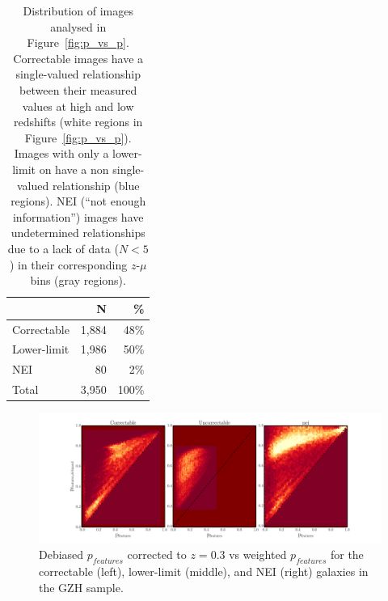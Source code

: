 \documentclass[twocolumn]{aastex6}
\begin{document}
\begin{table}
\center
\caption{Distribution of \ferengi{} images analysed in Figure~\ref{fig:p_vs_p}. Correctable images have a single-valued relationship between their measured \pfeatures{} values at high and low redshifts (white regions in Figure~\ref{fig:p_vs_p}). Images with only a lower-limit on \pfeatures{} have a non single-valued relationship (blue regions). NEI (``not enough information'') images have undetermined relationships due to a lack of data ($N<5$) in their corresponding $z$-$\mu$ bins (gray regions).\label{tbl:ferengi_corrections}}
\begin{tabular}{lrr}
\hline \hline
				                   & N       & \% \\
\hline 
Correctable                        & 1,884   & 48\% \\
Lower-limit                        & 1,986   & 50\% \\
NEI                                & 80      &  2\%\\
Total                              & 3,950   & 100\% \\
\hline \hline
\end{tabular}
\end{table}

\begin{figure}
\center
\includegraphics[width=\textwidth]{figures/debiased_corrections.pdf}
\caption{Debiased $p_{features}$ corrected to $z=0.3$ vs weighted $p_{features}$ for the correctable (left), lower-limit (middle), and NEI (right) galaxies in the GZH sample.}
\label{fig:debiased_corrections}
\end{figure}
\end{document}
